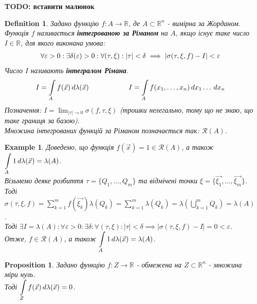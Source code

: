 \documentclass[a4paper, 10pt]{article}
\def\huge{\displaystyle}
\theoremstyle{theoremdd}
\theoremstyle{theoremdd}
\newtheorem{definition}[theorem]{Definition}
\theoremstyle{theoremdd}
\theoremstyle{theoremdd}
\newtheorem{example}[theorem]{Example}
\theoremstyle{theoremdd}
\newtheorem{proposition}[theorem]{Proposition}
\theoremstyle{theoremdd}
\theoremstyle{theoremdd}
\theoremstyle{theoremdd}
\begin{document}
\textbf{TODO: вставити малюнок}

\begin{definition}
Задано функцію $f: A \to \mathbb{R}$, де $A \subset \mathbb{R}^n$ - вимірна за Жорданом.\\
Функція $f$ називається \textbf{інтегрованою за Ріманом} на $A$, якщо існує таке число $I \in \mathbb{R}$, для якого виконана умова:
\begin{align*}
\forall \varepsilon > 0: \exists \delta(\varepsilon) > 0: \forall (\tau, \xi): |\tau| < \delta \implies \abs{\sigma(\tau, \xi, f) - I} < \varepsilon
\end{align*}
Число $I$ називають \textbf{інтегралом Рімана}.
\begin{align*}
I = \int\displaylimits_A f(\vec{x})\,d\lambda(\vec{x}) \hspace{2cm} I = \int\displaylimits_A f(x_1,\dots,x_n)\,dx_1\dots \,dx_n
\end{align*}
Позначення: $I = \huge\lim_{|\tau| \to 0} \sigma(f, \tau, \xi)$ (трошки нелегально, тому що не знаю, що таке границя за базою).\\
Множина інтегрованих функцій за Ріманом позначається так: $\mathcal{R}(A)$.
\end{definition}

\begin{example}
Доведемо, що функція $f(\vec{x}) = 1 \in \mathcal{R}(A)$, а також $\huge \int\displaylimits_A 1\,d \lambda(\vec{x}) = \lambda(A)$.\\
Візьмемо деяке розбиття $\tau = \{Q_1,\dots,Q_m\}$ та відмічені точки $\xi = \{\vec{\xi_1},\dots,\vec{\xi_m}\}$. Тоді\\
$\sigma(\tau, \xi, f) = \huge\sum_{k=1}^m f(\vec{\xi_k}) \lambda(Q_k) = \sum_{k=1}^m \lambda(Q_k) = \lambda\left( \bigcup_{k=1}^m Q_k \right) = \lambda(A)$.\\
Тоді $\exists I = \lambda(A): \forall \varepsilon > 0: \exists \delta: \forall (\tau,\xi): |\tau| < \delta \implies |\sigma(\tau,\xi,f) - I| = 0 < \varepsilon$.\\
Отже, $f \in \mathcal{R}(A)$, а також $\huge \int\displaylimits_A 1\,d \lambda(\vec{x}) = \lambda(A)$.
\end{example}

\begin{proposition}
Задано функцію $f: Z \to \mathbb{R}$ - обмежена на $Z \subset \mathbb{R}^n$ - множина міри нуль.\\
Тоді $\huge\int\displaylimits_Z f(\vec{x})\,d \lambda(\vec{x}) = 0$.
\end{proposition}
\end{document}
